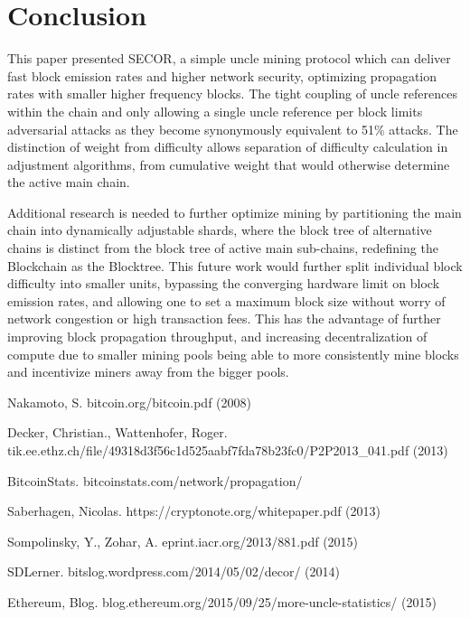 \documentclass{article}
\begin{document}
\section{Conclusion}
This paper presented SECOR, a simple uncle mining protocol which can deliver fast block emission rates and higher network security, optimizing propagation rates with smaller higher frequency blocks. The tight coupling of uncle references within the chain and only allowing a single uncle reference per block limits adversarial attacks as they become synonymously equivalent to 51\% attacks. The distinction of weight from difficulty allows separation of difficulty calculation in adjustment algorithms, from cumulative weight that would otherwise determine the active main chain.

Additional research is needed to further optimize mining by partitioning the main chain into dynamically adjustable shards, where the block tree of alternative chains is distinct from the block tree of active main sub-chains, redefining the Blockchain as the Blocktree. This future work would further split individual block difficulty into smaller units, bypassing the converging hardware limit on block emission rates, and allowing one to set a maximum block size without worry of network congestion or high transaction fees. This has the advantage of further improving block propagation throughput, and increasing decentralization of compute due to smaller mining pools being able to more consistently mine blocks and incentivize miners away from the bigger pools.

\begin{thebibliography}{999}

  Nakamoto, S.
  \newblock bitcoin.org/bitcoin.pdf (2008)

  Decker, Christian., Wattenhofer, Roger.
  \newblock tik.ee.ethz.ch/file/49318d3f56c1d525aabf7fda78b23fc0/P2P2013\_041.pdf (2013)

  BitcoinStats.
  \newblock bitcoinstats.com/network/propagation/

  Saberhagen, Nicolas.
  \newblock https://cryptonote.org/whitepaper.pdf (2013)

  Sompolinsky, Y., Zohar, A.
  \newblock eprint.iacr.org/2013/881.pdf (2015)

  SDLerner.
  \newblock bitslog.wordpress.com/2014/05/02/decor/ (2014)

  Ethereum, Blog.
  \newblock blog.ethereum.org/2015/09/25/more-uncle-statistics/ (2015)

\end{thebibliography}
\end{document}
